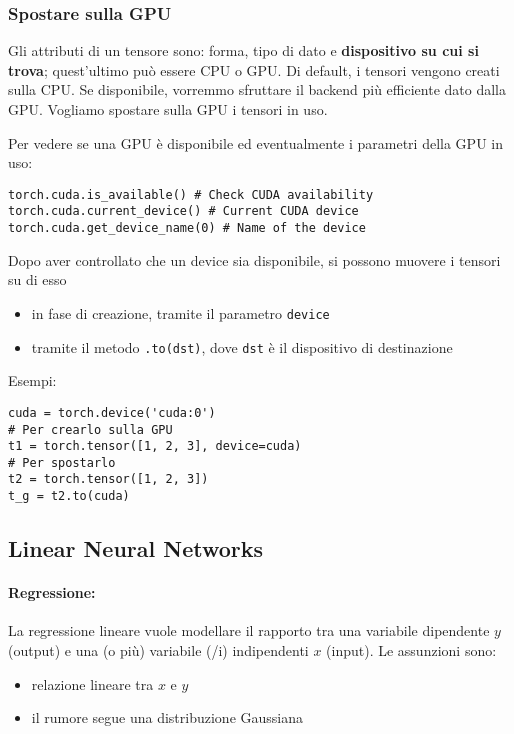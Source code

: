 \subsubsection{Spostare sulla GPU}

Gli attributi di un tensore sono: forma, tipo di dato e \textbf{dispositivo su cui si trova}; quest'ultimo può essere CPU o GPU. Di default, i tensori vengono creati sulla CPU. Se disponibile, vorremmo sfruttare il backend più efficiente dato dalla GPU. Vogliamo spostare sulla GPU i tensori in uso.

Per vedere se una GPU è disponibile ed eventualmente i parametri della GPU in uso:
\begin{verbatim}
torch.cuda.is_available() # Check CUDA availability
torch.cuda.current_device() # Current CUDA device
torch.cuda.get_device_name(0) # Name of the device
\end{verbatim}

Dopo aver controllato che un device sia disponibile, si possono muovere i tensori su di esso
\begin{itemize}
    \item in fase di creazione, tramite il parametro \texttt{device}
    
    \item tramite il metodo \texttt{.to(dst)}, dove \texttt{dst} è il dispositivo di destinazione
\end{itemize}

Esempi:
\begin{verbatim}
cuda = torch.device('cuda:0')
# Per crearlo sulla GPU
t1 = torch.tensor([1, 2, 3], device=cuda)
# Per spostarlo
t2 = torch.tensor([1, 2, 3])
t_g = t2.to(cuda)
\end{verbatim}

\subsection{Linear Neural Networks}

\paragraph{Regressione:} La regressione lineare vuole modellare il rapporto tra una variabile dipendente $y$ (output) e una (o più) variabile (/i) indipendenti $x$ (input). Le assunzioni sono: 
\begin{itemize}
    \item relazione lineare tra $x$ e $y$
    
    \item il rumore segue una distribuzione Gaussiana
\end{itemize}

